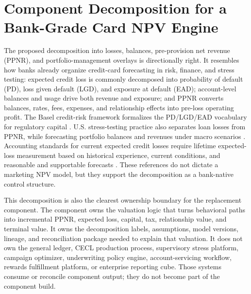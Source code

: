 \documentclass[11pt]{article}
\newcommand{\1}{\mathbf{1}}
\begin{document}
\section{Component Decomposition for a Bank-Grade Card NPV Engine}
\label{sec:component-decomposition}

The proposed decomposition into losses, balances, pre-provision net revenue
(PPNR), and portfolio-management overlays is directionally right. It resembles
how banks already organize credit-card forecasting in risk, finance, and stress
testing: expected credit loss is commonly decomposed into probability of default
(PD), loss given default (LGD), and exposure at default (EAD); account-level
balances and usage drive both revenue and exposure; and PPNR converts balances,
rates, fees, expenses, and relationship effects into pre-loss operating profit.
The Basel credit-risk framework formalizes the PD/LGD/EAD vocabulary for
regulatory capital \citep{bcbs2006basel}. U.S. stress-testing practice also
separates loan losses from PPNR, while forecasting portfolio balances and
revenues under macro scenarios
\citep{federalreserve2025stressmethodology,federalreserve2026stressmethodology}.
Accounting standards for current expected credit losses require lifetime
expected-loss measurement based on historical experience, current conditions,
and reasonable and supportable forecasts \citep{fasb2016asu201613}. These
references do not dictate a marketing NPV model, but they support the
decomposition as a bank-native control structure.

This decomposition is also the clearest ownership boundary for the replacement
component. The component owns the valuation logic that turns behavioral paths
into incremental PPNR, expected loss, capital, tax, relationship value, and
terminal value. It owns the decomposition labels, assumptions, model versions,
lineage, and reconciliation package needed to explain that valuation. It does
not own the general ledger, CECL production process, supervisory stress
platform, campaign optimizer, underwriting policy engine, account-servicing
workflow, rewards fulfillment platform, or enterprise reporting cube. Those
systems consume or reconcile component output; they do not become part of the
component build.
\end{document}
